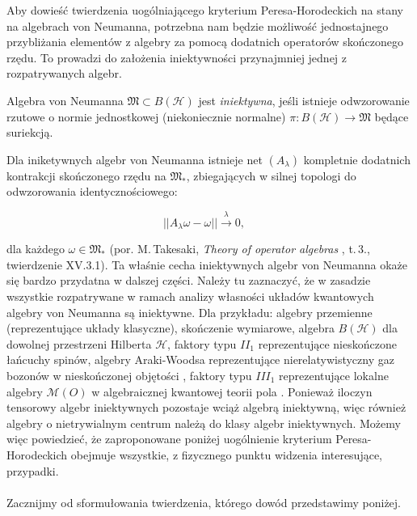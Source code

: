 Aby dowieść twierdzenia uogólniającego kryterium Peresa-Horodeckich
na stany na algebrach von Neumanna,
potrzebna nam będzie możliwość jednostajnego przybliżania elementów z algebry
za pomocą dodatnich operatorów skończonego rzędu.
To prowadzi do założenia iniektywności przynajmniej jednej z rozpatrywanych algebr.
\begin{Definition}
\label{def:injectivevNalgebras}
Algebra von Neumanna $\mathfrak{M}\subset B(\mathcal{H})$ jest \emph{iniektywna},
jeśli istnieje odwzorowanie rzutowe o normie jednostkowej (niekoniecznie normalne)
$\pi\!: B(\mathcal{H})\to\mathfrak{M}$ będące suriekcją.
\end{Definition}
Dla iniketywnych algebr von Neumanna
istnieje net $(A_{\lambda})$ kompletnie dodatnich
kontrakcji skończonego rzędu na  $\mathfrak{M}_*$,
zbiegających w silnej topologi do odwzorowania identycznościowego:
\begin{linenomath*}
 \begin{equation}
\label{RandomLabel:513684}
 || A_{\lambda} \omega - \omega || \stackrel{\lambda}{\longrightarrow} 0, \quad
 \end{equation}
\end{linenomath*}
dla każdego $\omega \in \mathfrak{M}_{*}$
(por. M.\,Takesaki, \emph{Theory of operator algebras}  \cite{Takesaki3},
\mbox{t.\,3.}, twierdzenie XV.3.1).
Ta właśnie cecha iniektywnych algebr von Neumanna okaże się bardzo przydatna
w dalszej części.
Należy tu zaznaczyć, że w zasadzie wszystkie rozpatrywane w ramach analizy
własności układów kwantowych algebry von Neumanna są iniektywne.
Dla przykładu: algebry przemienne (reprezentujące układy klasyczne),
skończenie wymiarowe,
algebra $B(\mathcal{H})$ dla dowolnej przestrzeni Hilberta $\mathcal{H}$,
faktory typu $II_1$ reprezentujące nieskończone łańcuchy spinów,
algebry Araki-Woodsa reprezentujące nierelatywistyczny gaz bozonów w nieskończonej objętości
\cite{araki1968classification},
faktory typu $III_1$ reprezentujące lokalne algebry $\mathcal{M}(O)$
w algebraicznej kwantowej teorii pola \cite{yngwason2005role}.
Ponieważ iloczyn tensorowy algebr iniektywnych pozostaje wciąż algebrą iniektywną,
więc również algebry o nietrywialnym centrum należą do klasy algebr iniektywnych.
Możemy więc powiedzieć, że zaproponowane poniżej uogólnienie kryterium Peresa-Horodeckich
obejmuje wszystkie, z fizycznego punktu widzenia interesujące, przypadki.

\paragraph{}
Zacznijmy od sformułowania twierdzenia, którego dowód przedstawimy poniżej.

